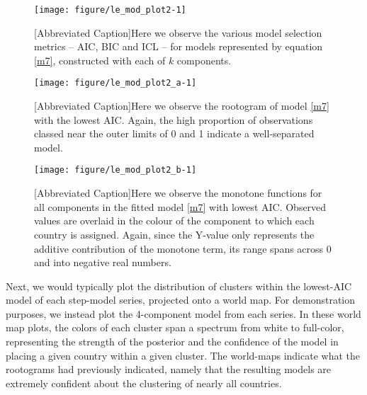 \documentclass[10pt]{olplainarticle}\usepackage[]{graphicx}\usepackage[]{color}
\makeatletter
\def\maxwidth{ %
  \ifdim\Gin@nat@width>\linewidth
    \linewidth
  \else
    \Gin@nat@width
  \fi
}
\newenvironment{knitrout}{}{} %
\makeatother
\begin{document}
\begin{figure}[H]
\begin{knitrout}
\color{fgcolor}

{\centering \texttt{[image: figure/le\_mod\_plot2-1]} 

}



\end{knitrout}
[Abbreviated Caption]{Here we observe the various model selection metrics -- AIC, BIC and ICL -- for models represented by equation \ref{m7}, constructed with each of $k$ components. }
\end{figure}

\begin{figure}[H]
\begin{knitrout}
\color{fgcolor}

{\centering \texttt{[image: figure/le\_mod\_plot2\_a-1]} 

}



\end{knitrout}
[Abbreviated Caption]{Here we observe the rootogram of model \ref{m7} with the lowest AIC. Again, the high proportion of observations classed near the outer limits of 0 and 1 indicate a well-separated model.}
\end{figure}

\begin{figure}[H]
\begin{knitrout}
\color{fgcolor}

{\centering \texttt{[image: figure/le\_mod\_plot2\_b-1]} 

}



\end{knitrout}
[Abbreviated Caption]{Here we observe the monotone functions for all components in the fitted model \ref{m7} with lowest AIC. Observed values are overlaid in the colour of the component to which each country is assigned. Again, since the Y-value only represents the additive contribution of the monotone term, its range spans across 0 and into negative real numbers.}
\end{figure}
 

Next, we would typically plot the distribution of clusters within the lowest-AIC model of each step-model series, projected onto a world map. For demonstration purposes, we instead plot the 4-component model from each series. In these world map plots, the colors of each cluster span a spectrum from white to full-color, representing the strength of the posterior and the confidence of the model in placing a given country within a given cluster. The world-maps indicate what the rootograms had previously indicated, namely that the resulting models are extremely confident about the clustering of nearly all countries.
\end{document}
